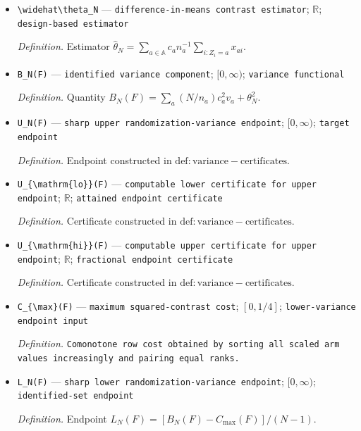 \documentclass{article}
\begin{document}
\begin{itemize}
  \item \texttt{\textbackslash{}\allowbreak{}widehat\textbackslash{}\allowbreak{}theta\_\allowbreak{}N} --- \texttt{difference-\allowbreak{}in-\allowbreak{}means contrast estimator}; \(\mathbb R\); \texttt{design-\allowbreak{}based estimator}
  \par\smallskip\noindent\emph{Definition.} Estimator \(\widehat\theta_N=\sum_{a\in\mathbb A}c_an_a^{-1}\sum_{i:Z_i=a}x_{ai}\).
  \item \texttt{B\_\allowbreak{}N(F)} --- \texttt{identified variance component}; \([0,\infty)\); \texttt{variance functional}
  \par\smallskip\noindent\emph{Definition.} Quantity \(B_N(F)=\sum_a(N/n_a)c_a^2v_a+\theta_N^2\).
  \item \texttt{U\_\allowbreak{}N(F)} --- \texttt{sharp upper randomization-\allowbreak{}variance endpoint}; \([0,\infty)\); \texttt{target endpoint}
  \par\smallskip\noindent\emph{Definition.} Endpoint constructed in \(\mathrm{def:variance-certificates}\).
  \item \texttt{U\_\allowbreak{}\{\textbackslash{}\allowbreak{}mathrm\{lo\}\allowbreak{}\}\allowbreak{}(F)} --- \texttt{computable lower certificate for upper endpoint}; \(\mathbb R\); \texttt{attained endpoint certificate}
  \par\smallskip\noindent\emph{Definition.} Certificate constructed in \(\mathrm{def:variance-certificates}\).
  \item \texttt{U\_\allowbreak{}\{\textbackslash{}\allowbreak{}mathrm\{hi\}\allowbreak{}\}\allowbreak{}(F)} --- \texttt{computable upper certificate for upper endpoint}; \(\mathbb R\); \texttt{fractional endpoint certificate}
  \par\smallskip\noindent\emph{Definition.} Certificate constructed in \(\mathrm{def:variance-certificates}\).
  \item \texttt{C\_\allowbreak{}\{\textbackslash{}\allowbreak{}max\}\allowbreak{}(F)} --- \texttt{maximum squared-\allowbreak{}contrast cost}; \([0,1/4]\); \texttt{lower-\allowbreak{}variance endpoint input}
  \par\smallskip\noindent\emph{Definition.} \texttt{Comonotone row cost obtained by sorting all scaled arm values increasingly and pairing equal ranks.}
  \item \texttt{L\_\allowbreak{}N(F)} --- \texttt{sharp lower randomization-\allowbreak{}variance endpoint}; \([0,\infty)\); \texttt{identified-\allowbreak{}set endpoint}
  \par\smallskip\noindent\emph{Definition.} Endpoint \(L_N(F)=[B_N(F)-C_{\max}(F)]/(N-1)\).

\end{itemize}
\end{document}
